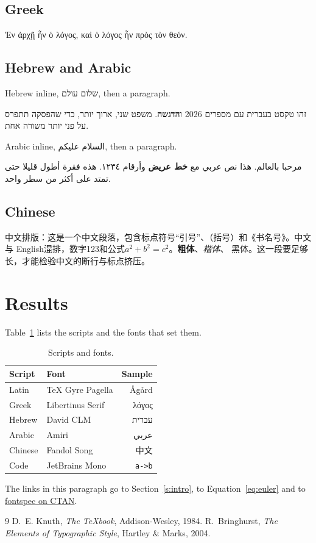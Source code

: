 \documentclass[11pt,a4paper]{article}
\begin{document}
\subsection{Greek}
\begin{greek}
Ἐν ἀρχῇ ἦν ὁ λόγος, καὶ ὁ λόγος ἦν πρὸς τὸν θεόν.
\end{greek}

\subsection{Hebrew and Arabic}
Hebrew inline, \texthebrew{שלום עולם}, then a paragraph.

\begin{hebrew}
זהו טקסט בעברית עם מספרים 2026 ו\textbf{הדגשה}. משפט שני, ארוך יותר, כדי
שהפסקה תתפרס על פני יותר משורה אחת.
\end{hebrew}

Arabic inline, \textarabic{السلام عليكم}, then a paragraph.

\begin{Arabic}
مرحبا بالعالم. هذا نص عربي مع \textbf{خط عريض} وأرقام ١٢٣٤. هذه فقرة
أطول قليلا حتى تمتد على أكثر من سطر واحد.
\end{Arabic}

\subsection{Chinese}
中文排版：这是一个中文段落，包含标点符号“引号”、（括号）和《书名号》。中文与
English混排，数字123和公式$a^2+b^2=c^2$。\textbf{粗体}、\textit{楷体}、
\textsf{黑体}。这一段要足够长，才能检验中文的断行与标点挤压。

\section{Results}\label{s:results}
Table~\ref{t:scripts} lists the scripts and the fonts that set them.
\begin{table}[h]
\centering
\begin{tabular}{llr}
\toprule
Script & Font & Sample \\
\midrule
Latin   & TeX Gyre Pagella & Ågård \\
Greek   & Libertinus Serif & \textgreek{λόγος} \\
Hebrew  & David CLM        & \texthebrew{עברית} \\
Arabic  & Amiri            & \textarabic{عربي} \\
Chinese & Fandol Song      & 中文 \\
Code    & JetBrains Mono   & \texttt{a->b} \\
\bottomrule
\end{tabular}
\caption{Scripts and fonts.}\label{t:scripts}
\end{table}
The links in this paragraph go to Section~\ref{s:intro}, to
Equation~\eqref{eq:euler} and to \href{https://ctan.org/pkg/fontspec}{fontspec on CTAN}.

\begin{thebibliography}{9}
 D.~E. Knuth, \emph{The \TeX book}, Addison-Wesley, 1984.
 R.~Bringhurst, \emph{The Elements of Typographic Style}, Hartley \& Marks, 2004.
\end{thebibliography}
\end{document}
